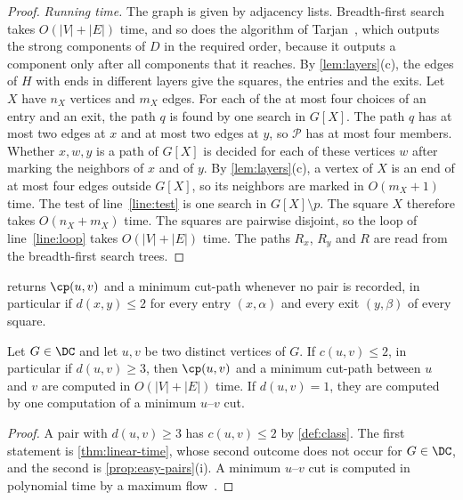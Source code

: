 \begin{proof}
\emph{Running time.}
The graph is given by adjacency lists.
Breadth-first search~\cite[Section~8.4]{Erickson2019Algorithms} takes $O(|V| + |E|)$ time, and so does the algorithm of Tarjan~\cite{Tarjan1972DFS}, which outputs the strong components of $D$ in the required order, because it outputs a component only after all components that it reaches.
By \cref{lem:layers}(c), the edges of $H$ with ends in different layers give the squares, the entries and the exits.
Let $X$ have $n_X$ vertices and $m_X$ edges.
For each of the at most four choices of an entry and an exit, the path $q$ is found by one search in $G[X]$.
The path $q$ has at most two edges at $x$ and at most two edges at $y$, so $\mathcal{P}$ has at most four members.
Whether $x, w, y$ is a path of $G[X]$ is decided for each of these vertices $w$ after marking the neighbors of $x$ and of $y$.
By \cref{lem:layers}(c), a vertex of $X$ is an end of at most four edges outside $G[X]$, so its neighbors are marked in $O(m_X + 1)$ time.
The test of line~\ref{line:test} is one search in $G[X] \setminus p$.
The square $X$ therefore takes $O(n_X + m_X)$ time.
The squares are pairwise disjoint, so the loop of line~\ref{line:loop} takes $O(|V| + |E|)$ time.
The paths $R_x$, $R_y$ and $R$ are read from the breadth-first search trees.
\end{proof}

 returns $\cp(u, v)$ and a minimum cut-path whenever no pair is recorded, in particular if $d(x, y) \leq 2$ for every entry $(x, \alpha)$ and every exit $(y, \beta)$ of every square.

\begin{corollary}
\label{cor:class-pairs}
Let $G \in \DC$ and let $u, v$ be two distinct vertices of $G$.
If $c(u, v) \leq 2$, in particular if $d(u, v) \geq 3$, then $\cp(u, v)$ and a minimum cut-path between $u$ and $v$ are computed in $O(|V| + |E|)$ time.
If $d(u, v) = 1$, they are computed by one computation of a minimum $u$--$v$ cut.
\end{corollary}

\begin{proof}
A pair with $d(u, v) \geq 3$ has $c(u, v) \leq 2$ by \cref{def:class}.
The first statement is \cref{thm:linear-time}, whose second outcome does not occur for $G \in \DC$, and the second is \cref{prop:easy-pairs}(i).
A minimum $u$--$v$ cut is computed in polynomial time by a maximum flow~\cite[Sections~10.3 and~10.4]{Erickson2019Algorithms}.
\end{proof}

